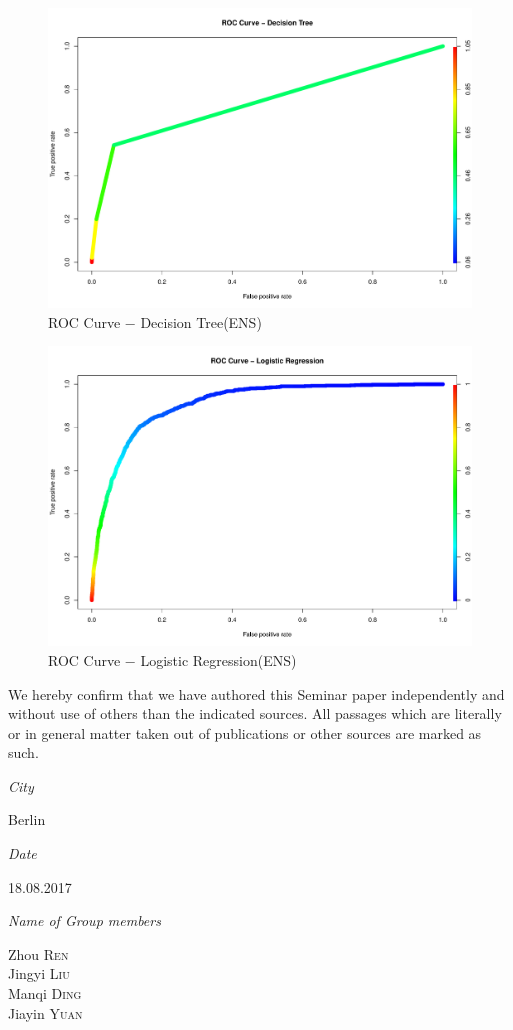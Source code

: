 \documentclass[12pt, a4paper, bibliography=totoc, english]{scrartcl}
\begin{document}
\begin{figure}
	\centering
	\includegraphics[width=0.7\linewidth]{ENS3}
	\caption{ROC Curve − Decision Tree(ENS)}
	\label{fig:ens3}
\end{figure}
\begin{figure}
	\centering
	\includegraphics[width=0.7\linewidth]{ENS4}
	\caption{ROC Curve − Logistic Regression(ENS)}
	\label{fig:ens4}
\end{figure}


\printbibliography


We hereby confirm that we have authored this Seminar paper independently and without use of others than the indicated sources. All passages which are literally or in general matter taken out of publications or other sources are marked as such.



\emph{City}            \begin{flushright}
	Berlin\\
\end{flushright}

\emph{Date}            \begin{flushright}
	18.08.2017\\
\end{flushright}

\emph{Name of Group members}\\
\begin{flushright}
	Zhou \textsc{Ren}\\
	Jingyi \textsc{Liu}\\
	Manqi \textsc{Ding}\\
	Jiayin \textsc{Yuan}
\end{flushright}



\end{document}
